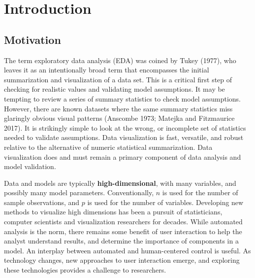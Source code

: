 \documentclass[
  11,
]{article}
\begin{document}
\newpage

% 

\doublespacing

\newpage
{}
\hypersetup{linkcolor = blue}

{
\hypersetup{linkcolor=}
\setcounter{tocdepth}{2}
\tableofcontents
}
\hypertarget{sec:intro}{%
\section{Introduction}\label{sec:intro}}

\hypertarget{motivation}{%
\subsection{Motivation}\label{motivation}}

The term exploratory data analysis (EDA) was coined by Tukey (1977), who leaves it as an intentionally broad term that encompasses the initial summarization and visualization of a data set. This is a critical first step of checking for realistic values and validating model assumptions. It may be tempting to review a series of summary statistics to check model assumptions. However, there are known datasets where the same summary statistics miss glaringly obvious visual patterns (Anscombe 1973; Matejka and Fitzmaurice 2017). It is strikingly simple to look at the wrong, or incomplete set of statistics needed to validate assumptions. Data visualization is fast, versatile, and robust relative to the alternative of numeric statistical summarization. Data visualization does and must remain a primary component of data analysis and model validation.

Data and models are typically \textbf{high-dimensional}, with many variables, and possibly many model parameters. Conventionally, \(n\) is used for the number of sample observations, and \(p\) is used for the number of variables. Developing new methods to visualize high dimensions has been a pursuit of statisticians, computer scientists and visualization researchers for decades. While automated analysis is the norm, there remains some benefit of user interaction to help the analyst understand results, and determine the importance of components in a model. An interplay between automated and human-centered control is useful. As technology changes, new approaches to user interaction emerge, and exploring these technologies provides a challenge to researchers.
\end{document}
